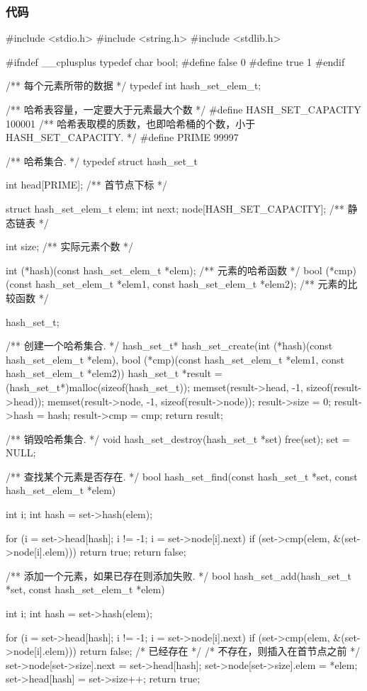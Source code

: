 \subsubsection{代码}
\begin{Codex}[label=hash_set.c]
#include <stdio.h>
#include <string.h>
#include <stdlib.h>

#ifndef __cplusplus
typedef char bool;
#define false 0
#define true 1
#endif

/** 每个元素所带的数据 */
typedef int hash_set_elem_t;

/** 哈希表容量，一定要大于元素最大个数  */
#define HASH_SET_CAPACITY  100001
/** 哈希表取模的质数，也即哈希桶的个数，小于 HASH_SET_CAPACITY. */
#define PRIME  99997

/** 哈希集合. */
typedef struct hash_set_t {
    int head[PRIME];  /** 首节点下标 */

    struct {
        hash_set_elem_t elem;
        int next;
    } node[HASH_SET_CAPACITY];  /** 静态链表 */

    int size; /** 实际元素个数 */

    int (*hash)(const hash_set_elem_t *elem); /** 元素的哈希函数 */
    bool (*cmp)(const hash_set_elem_t *elem1,
            const hash_set_elem_t *elem2);  /** 元素的比较函数 */
} hash_set_t;

/** 创建一个哈希集合. */
hash_set_t* hash_set_create(int (*hash)(const hash_set_elem_t *elem),
        bool (*cmp)(const hash_set_elem_t *elem1,
                const hash_set_elem_t *elem2)) {
    hash_set_t *result = (hash_set_t*)malloc(sizeof(hash_set_t));
    memset(result->head, -1, sizeof(result->head));
    memset(result->node, -1, sizeof(result->node));
    result->size = 0;
    result->hash = hash;
    result->cmp = cmp;
    return result;
}

/** 销毁哈希集合. */
void hash_set_destroy(hash_set_t *set) {
    free(set);
    set = NULL;
}

/** 查找某个元素是否存在. */
bool hash_set_find(const hash_set_t *set, const hash_set_elem_t *elem) {
    int i;
    int hash = set->hash(elem);

    for (i = set->head[hash]; i != -1; i = set->node[i].next) {
        if (set->cmp(elem, &(set->node[i].elem))) {
            return true;
        }
    }
    return false;
}

/** 添加一个元素，如果已存在则添加失败. */
bool hash_set_add(hash_set_t *set, const hash_set_elem_t *elem) {
    int i;
    int hash = set->hash(elem);

    for (i = set->head[hash]; i != -1; i = set->node[i].next) {
        if (set->cmp(elem, &(set->node[i].elem))) {
            return false; /* 已经存在 */
        }
    }
    /* 不存在，则插入在首节点之前 */
    set->node[set->size].next = set->head[hash];
    set->node[set->size].elem = *elem;
    set->head[hash] = set->size++;
    return true;
}
\end{Codex}


